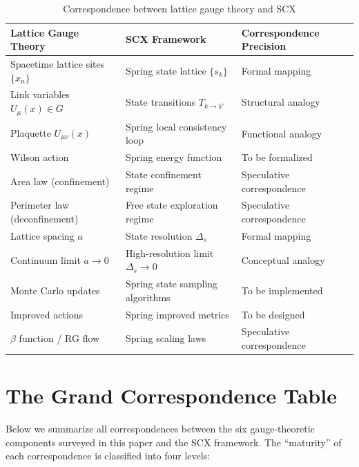 \documentclass[12pt,a4paper]{article}
\theoremstyle{remark}
\begin{document}
\begin{table}[H]
\centering
\caption{Correspondence between lattice gauge theory and SCX}
\label{tab:lattice_correspondence}
\begin{tabular}{p{4.5cm} p{4.5cm} p{4.5cm}}
\toprule
\textbf{Lattice Gauge Theory} & \textbf{SCX Framework} & \textbf{Correspondence Precision} \\
\midrule
Spacetime lattice sites $\{x_n\}$ & Spring state lattice $\{s_k\}$ & Formal mapping \\
Link variables $U_\mu(x) \in G$ & State transitions $T_{k\to k'}$ & Structural analogy \\
Plaquette $U_{\mu\nu}(x)$ & Spring local consistency loop & Functional analogy \\
Wilson action & Spring energy function & To be formalized \\
Area law (confinement) & State confinement regime & Speculative correspondence \\
Perimeter law (deconfinement) & Free state exploration regime & Speculative correspondence \\
Lattice spacing $a$ & State resolution $\Delta_s$ & Formal mapping \\
Continuum limit $a \to 0$ & High-resolution limit $\Delta_s \to 0$ & Conceptual analogy \\
Monte Carlo updates & Spring state sampling algorithms & To be implemented \\
Improved actions & Spring improved metrics & To be designed \\
$\beta$ function / RG flow & Spring scaling laws & Speculative correspondence \\
\bottomrule
\end{tabular}
\end{table}

\newpage

\section{The Grand Correspondence Table}

Below we summarize all correspondences between the six gauge-theoretic components surveyed in this paper and the SCX framework.
The ``maturity'' of each correspondence is classified into four levels:
\end{document}
